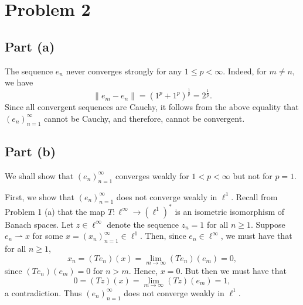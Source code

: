 \documentclass[11pt]{article}
\theoremstyle{thmstyle}
\theoremstyle{defstyle}
\newcommand{\weakto}{\rightharpoonup}
\renewcommand{\le}{\leqslant}
\renewcommand{\ge}{\geqslant}
\begin{document}
\section{Problem 2}

\subsection{Part (a)}

The sequence $e_n$ never converges strongly for any $1\le p < \infty$. Indeed, for $m\ne n$, we have 
\begin{equation*}
    \|e_m - e_n\| = \left(1^p + 1^p\right)^{\frac{1}{p}} = 2^{\frac{1}{p}}.
\end{equation*}
Since all convergent sequences are Cauchy, it follows from the above equality that $(e_n)_{n = 1}^\infty$ cannot be Cauchy, and therefore, cannot be convergent. 

\subsection{Part (b)}

We shall show that $(e_n)_{n = 1}^\infty$ converges weakly for $1 < p < \infty$ but not for $p = 1$.

First, we show that $(e_n)_{n = 1}^\infty$ does not converge weakly in $\ell^1$. Recall from Problem 1 (a) that the map $T\colon \ell^\infty\to\left(\ell^1\right)^\ast$ is an isometric isomorphism of Banach spaces. Let $z\in\ell^\infty$ denote the sequence $z_n = 1$ for all $n\ge 1$. Suppose $e_n\weakto x$ for some $x = (x_n)_{n = 1}^\infty\in\ell^1$. Then, since $e_n\in\ell^\infty$, we must have that for all $n\ge 1$, 
\begin{equation*}
    x_n = (Te_n)(x) = \lim_{m\to\infty} (Te_n)(e_m) = 0,
\end{equation*}
since $(Te_n)(e_m) = 0$ for $n > m$. Hence, $x = 0$. But then we must have that 
\begin{equation*}
    0 = (Tz)(x) = \lim_{m\to\infty} (Tz)(e_m) = 1,
\end{equation*}
a contradiction. Thus $(e_n)_{n = 1}^\infty$ does not converge weakly in $\ell^1$.
\end{document}
